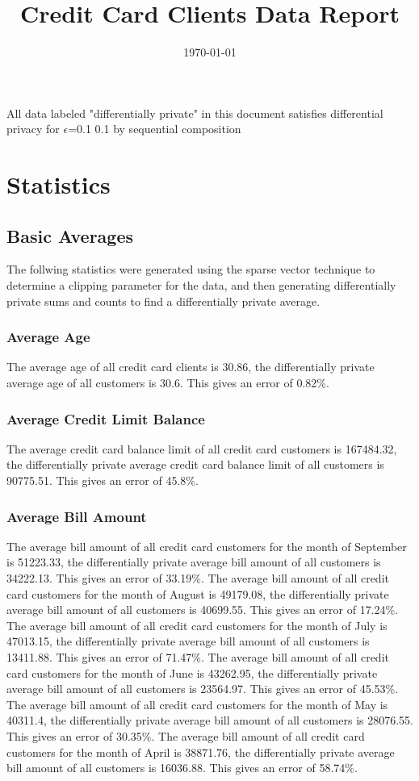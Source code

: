 \documentclass{article}%
\title{Credit Card Clients Data Report}%
\date{\today}%
\begin{document}
%
\normalsize%
\maketitle%
All data labeled "differentially private" in this document satisfies differential privacy for %
$\epsilon$=0.1%
0.1 by sequential composition%
\section{Statistics}%
\label{sec:Statistics}%
\subsection{Basic Averages}%
\label{subsec:BasicAverages}%
The follwing statistics were generated using the sparse vector technique to determine a clipping parameter for the data, and then generating differentially private sums and counts to find a differentially private average.%
\subsubsection{Average Age}%
\label{ssubsec:AverageAge}%
The average age of all credit card clients is 30.86, the differentially private average age of all customers is 30.6. This gives an error of 0.82\%.

%
\subsubsection{Average Credit Limit Balance}%
\label{ssubsec:AverageCreditLimitBalance}%
The average credit card balance limit of all credit card customers is 167484.32, the differentially private average credit card balance limit of all customers is 90775.51. This gives an error of 45.8\%.

%
\subsubsection{Average Bill Amount}%
\label{ssubsec:AverageBillAmount}%
The average bill amount of all credit card customers for the month of September is 51223.33, the differentially private average bill amount of all customers is 34222.13. This gives an error of 33.19\%.%
The average bill amount of all credit card customers for the month of August is 49179.08, the differentially private average bill amount of all customers is 40699.55. This gives an error of 17.24\%.%
The average bill amount of all credit card customers for the month of July is 47013.15, the differentially private average bill amount of all customers is 13411.88. This gives an error of 71.47\%.%
The average bill amount of all credit card customers for the month of June is 43262.95, the differentially private average bill amount of all customers is 23564.97. This gives an error of 45.53\%.%
The average bill amount of all credit card customers for the month of May is 40311.4, the differentially private average bill amount of all customers is 28076.55. This gives an error of 30.35\%.%
The average bill amount of all credit card customers for the month of April is 38871.76, the differentially private average bill amount of all customers is 16036.88. This gives an error of 58.74\%.
\end{document}
